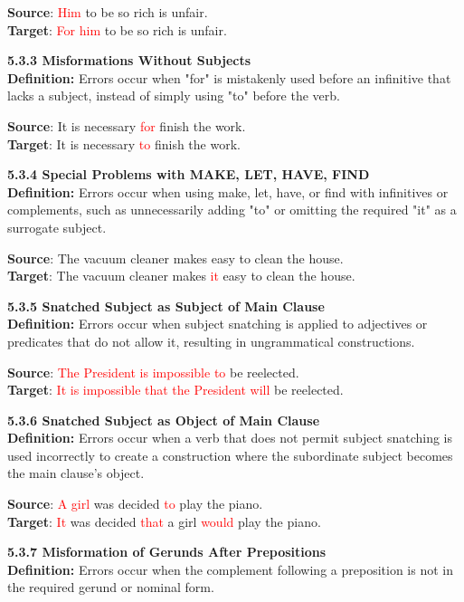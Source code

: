 \begin{tcolorbox}[breakable]
\textbf{Source}: \textcolor{red}{Him} to be so rich is unfair. \\
\textbf{Target}: \textcolor{red}{For him} to be so rich is unfair.


\noindent \textbf{5.3.3 Misformations Without Subjects}\\
\textbf{Definition:} Errors occur when "for" is mistakenly used before an infinitive that lacks a subject, instead of simply using "to" before the verb.


\textbf{Source}: It is necessary \textcolor{red}{for} finish the work. \\
\textbf{Target}: It is necessary \textcolor{red}{to} finish the work.


\noindent \textbf{5.3.4 Special Problems with MAKE, LET, HAVE, FIND}\\
\textbf{Definition:} Errors occur when using make, let, have, or find with infinitives or complements, such as unnecessarily adding "to" or omitting the required "it" as a surrogate subject.


\textbf{Source}: The vacuum cleaner makes easy to clean the house. \\
\textbf{Target}: The vacuum cleaner makes \textcolor{red}{it} easy to clean the house.


\noindent \textbf{5.3.5 Snatched Subject as Subject of Main Clause}\\
\textbf{Definition:} Errors occur when subject snatching is applied to adjectives or predicates that do not allow it, resulting in ungrammatical constructions.


\textbf{Source}: \textcolor{red}{The President is impossible to} be reelected. \\
\textbf{Target}: \textcolor{red}{It is impossible that the President will} be reelected.


\noindent \textbf{5.3.6 Snatched Subject as Object of Main Clause}\\
\textbf{Definition:} Errors occur when a verb that does not permit subject snatching is used incorrectly to create a construction where the subordinate subject becomes the main clause's object.


\textbf{Source}: \textcolor{red}{A girl} was decided \textcolor{red}{to} play the piano. \\
\textbf{Target}: \textcolor{red}{It} was decided \textcolor{red}{that} a girl \textcolor{red}{would} play the piano.


\noindent \textbf{5.3.7 Misformation of Gerunds After Prepositions}\\
\textbf{Definition:} Errors occur when the complement following a preposition is not in the required gerund or nominal form.



\end{tcolorbox}
